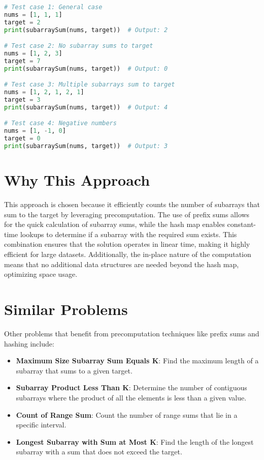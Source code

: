 \begin{lstlisting}[language=Python]
# Test case 1: General case
nums = [1, 1, 1]
target = 2
print(subarraySum(nums, target))  # Output: 2

# Test case 2: No subarray sums to target
nums = [1, 2, 3]
target = 7
print(subarraySum(nums, target))  # Output: 0

# Test case 3: Multiple subarrays sum to target
nums = [1, 2, 1, 2, 1]
target = 3
print(subarraySum(nums, target))  # Output: 4

# Test case 4: Negative numbers
nums = [1, -1, 0]
target = 0
print(subarraySum(nums, target))  # Output: 3
\end{lstlisting}

\section*{Why This Approach}

This approach is chosen because it efficiently counts the number of subarrays that sum to the target by leveraging precomputation. The use of prefix sums allows for the quick calculation of subarray sums, while the hash map enables constant-time lookups to determine if a subarray with the required sum exists. This combination ensures that the solution operates in linear time, making it highly efficient for large datasets. Additionally, the in-place nature of the computation means that no additional data structures are needed beyond the hash map, optimizing space usage.

\section*{Similar Problems}

Other problems that benefit from precomputation techniques like prefix sums and hashing include:

\begin{itemize}
    \item \textbf{Maximum Size Subarray Sum Equals K}: Find the maximum length of a subarray that sums to a given target.
    \item \textbf{Subarray Product Less Than K}: Determine the number of contiguous subarrays where the product of all the elements is less than a given value.
    \item \textbf{Count of Range Sum}: Count the number of range sums that lie in a specific interval.
    \item \textbf{Longest Subarray with Sum at Most K}: Find the length of the longest subarray with a sum that does not exceed the target.
\end{itemize}

